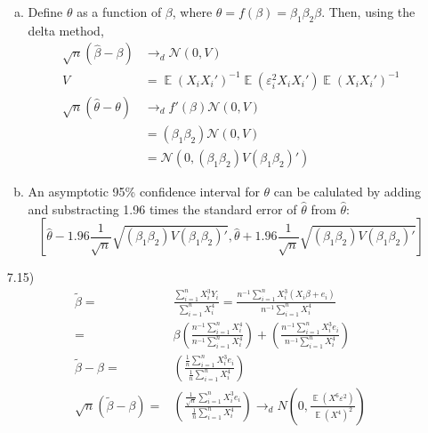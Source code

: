 \documentclass{article}
\newcommand{\N}{\mathcal{N}}
\renewcommand{\tilde}[1]{\widetilde{#1}}
\newcommand{\tb}{\tilde{\beta}}
\newcommand{\bhat}{\hat{\beta}}
\DeclareMathOperator{\E}{\mathbb{E}}%
\begin{document}
\begin{itemize}
\begin{enumerate}[(a)]
			\item Define $\theta$ as a function of $\beta$, where ${\theta=f(\beta)=\beta_1\beta_2\beta}$. Then, using the delta method,
				\begin{align*}
					\sqrt{n}(\bhat-\beta)			&\rightarrow_d 	\N(0,V)					\\
					V &= \E(X_iX_i')^{-1}\E(\varepsilon_i^2X_iX_i')\E(X_iX_i')^{-1}			\\
					\sqrt{n}(\hat{\theta}-\theta)	&\rightarrow_d 	f'(\beta)\N(0,V)		\\
													&= (\beta_1\beta_2)\N(0,V)				\\
													&=\N\left(0,(\beta_1\beta_2)V(\beta_1\beta_2)'\right)
				\end{align*}
			
			\item An asymptotic 95\% confidence interval for $\theta$ can be calulated by adding and substracting 1.96 times the standard error of $\hat{\theta}$ from $\hat{\theta}$:
				\[
					\left[\hat{\theta}-1.96\frac{1}{\sqrt{n}}\sqrt{(\beta_1\beta_2)V(\beta_1\beta_2)'},\hat{\theta}+1.96\frac{1}{\sqrt{n}}\sqrt{(\beta_1\beta_2)V(\beta_1\beta_2)'}\right]
				\]
			
		\end{enumerate}
	
	\item[7.15)] 
	\begin{align*}
		\tb	=	& \frac{\sum_{i=1}^n X_i^3Y_i}{\sum_{i=1}^nX_i^4} = \frac{n^{-1}\sum_{i=1}^n X_i^3(X_i\beta+e_i)}{n^{-1}\sum_{i=1}^nX_i^4} \\
			= 	& \beta\left(\frac{n^{-1}\sum_{i=1}^n X_i^4}{n^{-1}\sum_{i=1}^nX_i^4}\right) + \left(\frac{n^{-1}\sum_{i=1}^n X_i^3e_i}{n^{-1}\sum_{i=1}^nX_i^4}\right)	\\
\tb - \beta	=	& \left(\frac{\frac{1}{n}\sum_{i=1}^n X_i^3e_i}{\frac{1}{n}\sum_{i=1}^nX_i^4}\right)	\\
\sqrt{n}(\tb - \beta) =	& \left(\frac{\frac{1}{\sqrt{n}}\sum_{i=1}^n X_i^3e_i}{\frac{1}{n}\sum_{i=1}^nX_i^4}\right)	\rightarrow_d N\left(0,\frac{\E(X^6\varepsilon^2)}{\E(X^4)^2}\right)
	\end{align*}
	
\end{itemize}


\end{document}
